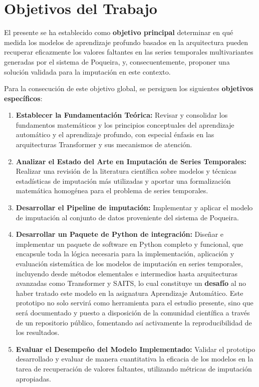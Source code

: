 \section{Objetivos del Trabajo}
\label{sec:objetivos_tfg} 

El presente  se ha establecido como \textbf{objetivo principal} determinar en qué medida los modelos de aprendizaje profundo basados en la arquitectura  pueden recuperar eficazmente los valores faltantes en las series temporales multivariantes generadas por el sistema  de Poqueira, y, consecuentemente, proponer una solución validada para la imputación en este contexto.

Para la consecución de este objetivo global, se persiguen los siguientes \textbf{objetivos específicos}:

\begin{enumerate}
    \item \textbf{Establecer la Fundamentación Teórica:}
    Revisar y consolidar los fundamentos matemáticos y los principios conceptuales del aprendizaje automático y el aprendizaje profundo, con especial énfasis en las arquitecturas Transformer y sus mecanismos de atención.

  
    \item \textbf{Analizar el Estado del Arte en Imputación de Series Temporales:}
    Realizar una revisión de la literatura científica sobre modelos y técnicas estadísticas de imputación más utilizadas y aportar una formalización matemática homogénea para el problema de series temporales.

    \item \textbf{Desarrollar el Pipeline de imputación:}
    Implementar y aplicar el modelo de imputación  al conjunto de datos proveniente del sistema  de Poqueira.
    
   \item \textbf{Desarrollar un Paquete de Python de integración:}
    Diseñar e implementar un paquete de software en Python completo y funcional, que encapsule toda la lógica necesaria para la implementación, aplicación y evaluación sistemática de los modelos de imputación en series temporales, incluyendo desde métodos elementales e intermedios hasta arquitecturas avanzadas como Transformer y SAITS,  lo cual constituye un \textbf{desafío} al no haber tratado este modelo en la asignatura Aprendizaje Automático. 
    Este prototipo no solo servirá como herramienta para el estudio presente, sino que será documentado y puesto a disposición de la comunidad científica a través de un repositorio público, fomentando así activamente la reproducibilidad de los resultados.

    \item \textbf{Evaluar el Desempeño del Modelo Implementado:}
    Validar el prototipo desarrollado y evaluar de manera cuantitativa la eficacia de los modelos en la tarea de recuperación de valores faltantes, utilizando métricas de imputación apropiadas.

\end{enumerate}

